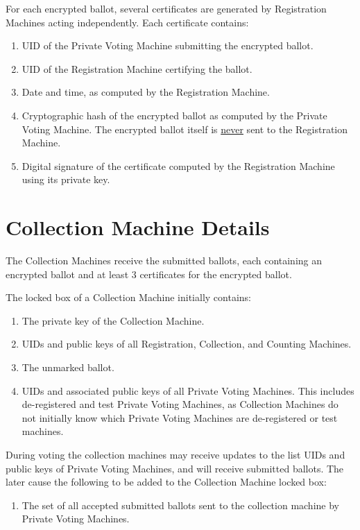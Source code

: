 \documentclass[12pt]{article}
\begin{document}
For each encrypted ballot, several certificates are generated
by Registration Machines acting independently.  Each certificate
contains:
\begin{enumerate}
\item UID of the Private Voting Machine submitting the encrypted ballot.
\item UID of the Registration Machine certifying the ballot.
\item Date and time, as computed by the Registration Machine.
\item Cryptographic hash of the encrypted ballot as computed by the
      Private Voting Machine.  The encrypted ballot itself is
      \underline{never} sent to the Registration Machine.
\item Digital signature of the certificate computed
by the Registration Machine using its private key.
\end{enumerate}

\section{Collection Machine Details}

The Collection Machines receive the submitted ballots, each containing
an encrypted ballot and at least 3 certificates for the encrypted
ballot.

The locked box of a Collection Machine initially contains:
\begin{enumerate}
\item The private key of the Collection Machine.
\item UIDs and public keys of all Registration, Collection, and Counting
      Machines.
\item The unmarked ballot.
\item UIDs and associated public keys of all Private Voting
Machines.  This includes de-registered and test Private Voting
Machines, as Collection Machines do not initially know which Private Voting
Machines are de-registered or test machines.
\setcounter{CML-COUNTER}{\value{enumi}}
\end{enumerate}

During voting the collection machines may receive updates to the
list UIDs and public keys of Private Voting Machines, and will
receive submitted ballots.  The later cause the following to be
added to the Collection Machine locked box:

\begin{enumerate}
\setcounter{enumi}{\value{CML-COUNTER}}
\item The set of all accepted submitted ballots sent to the collection machine
by Private Voting Machines.
\setcounter{CML-COUNTER}{\value{enumi}}
\end{enumerate}
\end{document}
